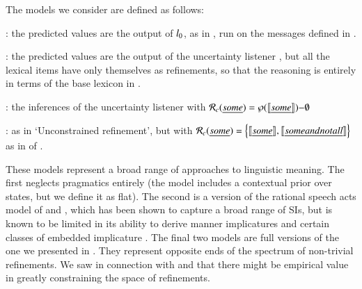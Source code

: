 \documentclass[leqno,12pt]{article}
\begin{document}
The models we consider are defined as follows:
%
\begin{examples}
\item 
  \begin{examples}
  \item {}: the predicted values are the output
    of $l_{0}$, as in , run on the messages
    defined in .
  \item {}: the predicted values are the
    output of the uncertainty listener , but all the
    lexical items have only themselves as refinements, so that the
    reasoning is entirely in terms of the base lexicon in
    .
  \item {}: the inferences of the
    uncertainty listener  with $\mathcal{R}_{c}(\emph{some})
    = \wp(\llbracket\emph{some}\rrbracket){-}\emptyset$
  \item {}: as in `Unconstrained
    refinement', but with
    $\mathcal{R}_{c}(\emph{some}) = \left\{ \llbracket\emph{some}\rrbracket, \llbracket\emph{some
          and not all}\rrbracket \right\}$
    as in  of .
  \end{examples}
\end{examples}

These models represent a broad range of approaches to linguistic
meaning. The first neglects pragmatics entirely (the model includes a
contextual prior over states, but we define it as flat). The second is
a version of the rational speech acts model of
\citet{Frank:Goodman:2012} and \citet{Goodman:Stuhlmuller:2013}, which
has been shown to capture a broad range of SIs, but is known to be
limited in its ability to derive manner implicatures and certain
classes of embedded implicature
\citep{Bergen:Goodman:Levy:2012,Bergen:Levy:Goodman:2014}. The final
two models are full versions of the one we presented in
. They represent opposite ends of the spectrum of
non-trivial refinements. We saw in connection with
 and  that there
might be empirical value in greatly constraining the space of
refinements.  
\end{document}

